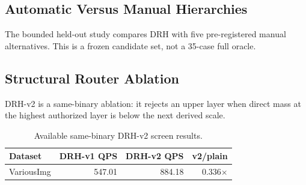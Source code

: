 {\subsection{Automatic Versus Manual Hierarchies}
The bounded held-out study compares DRH with five pre-registered manual alternatives. This is a frozen candidate set, not a 35-case full oracle.
\begin{table}[t]
\centering
\small
\caption{Screen-level gated DRH results at Recall@10 $\geq0.90$.}
\label{tab:heldout}
\end{table}
\begin{table}[t]
\centering
\small
\caption{One fixed DRH plan versus one fixed manual plan per held-out dataset (geometric-mean QPS).}
\label{tab:heldout-global}
\end{table}

\subsection{Structural Router Ablation}
DRH-v2 is a same-binary ablation: it rejects an upper layer when direct mass at the highest authorized layer is below the next derived scale.
\begin{table}[t]
\centering
\small
\caption{Available same-binary DRH-v2 screen results.}
\label{tab:drh-v2}
\begin{tabular}{lrrr}
\toprule
Dataset & DRH-v1 QPS & DRH-v2 QPS & v2/plain \\
\midrule
VariousImg & 547.01 & 884.18 & 0.336$\times$ \\
\bottomrule
\end{tabular}
\end{table}

}
